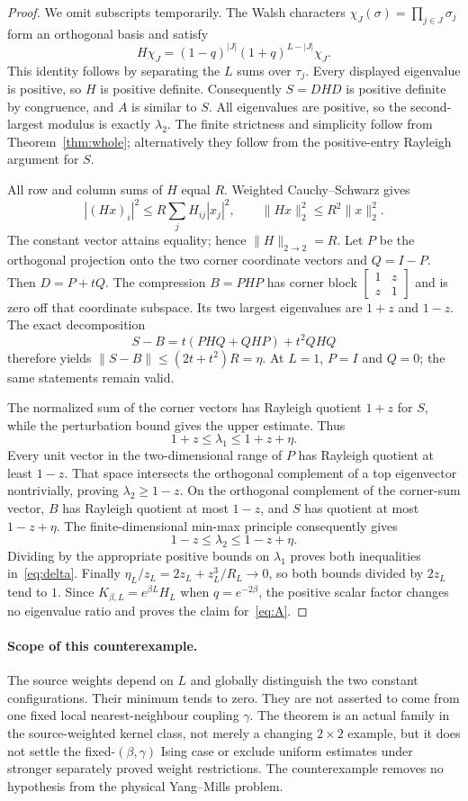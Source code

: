 \documentclass[11pt]{article}
\begin{document}
\begin{proof}
We omit subscripts temporarily. The Walsh characters
$\chi_J(\sigma)=\prod_{j\in J}\sigma_j$ form an orthogonal basis and satisfy
\[
 H\chi_J=(1-q)^{|J|}(1+q)^{L-|J|}\chi_J.
\]
This identity follows by separating the $L$ sums over $\tau_j$.
Every displayed eigenvalue is positive, so $H$ is positive definite.
Consequently $S=DHD$ is positive definite by congruence, and $A$ is similar to
$S$. All eigenvalues are positive, so the second-largest modulus is exactly
$\lambda_2$. The finite strictness and simplicity follow from
Theorem~\ref{thm:whole}; alternatively they follow from the positive-entry
Rayleigh argument for $S$.

All row and column sums of $H$ equal $R$. Weighted Cauchy--Schwarz gives
\[
 |(Hx)_i|^2\le R\sum_jH_{ij}|x_j|^2,
 \qquad \|Hx\|_2^2\le R^2\|x\|_2^2.
\]
The constant vector attains equality; hence $\|H\|_{2\to2}=R$.
Let $P$ be the orthogonal projection onto the two corner coordinate vectors
and $Q=I-P$. Then $D=P+tQ$. The compression $B=PHP$ has corner block
$\left[\begin{smallmatrix}1&z\\z&1\end{smallmatrix}\right]$ and is zero off
that coordinate subspace. Its two largest eigenvalues are $1+z$ and $1-z$.
The exact decomposition
\[
 S-B=t(PHQ+QHP)+t^2QHQ
\]
therefore yields $\|S-B\|\le(2t+t^2)R=\eta$.
At $L=1$, $P=I$ and $Q=0$; the same statements remain valid.

The normalized sum of the corner vectors has Rayleigh quotient $1+z$ for
$S$, while the perturbation bound gives the upper estimate. Thus
\[
 1+z\le\lambda_1\le1+z+\eta.
\]
Every unit vector in the two-dimensional range of $P$ has Rayleigh quotient
at least $1-z$. That space intersects the orthogonal complement of a top
eigenvector nontrivially, proving $\lambda_2\ge1-z$.
On the orthogonal complement of the corner-sum vector, $B$ has Rayleigh
quotient at most $1-z$, and $S$ has quotient at most $1-z+\eta$.
The finite-dimensional min-max principle consequently gives
\[
 1-z\le\lambda_2\le1-z+\eta.
\]
Dividing by the appropriate positive bounds on $\lambda_1$ proves both
inequalities in~\eqref{eq:delta}. Finally
$\eta_L/z_L=2z_L+z_L^3/R_L\to0$, so both bounds divided by $2z_L$ tend to $1$.
Since $K_{\beta,L}=e^{\beta L}H_L$ when $q=e^{-2\beta}$, the positive scalar
factor changes no eigenvalue ratio and proves the claim for~\eqref{eq:A}.
\end{proof}

\paragraph{Scope of this counterexample.}
The source weights depend on $L$ and globally distinguish the two constant
configurations. Their minimum tends to zero. They are not asserted to come from
one fixed local nearest-neighbour coupling $\gamma$. The theorem is an actual
family in the source-weighted kernel class, not merely a changing $2\times2$
example, but it does not settle the fixed-$(\beta,\gamma)$ Ising case or exclude
uniform estimates under stronger separately proved weight restrictions.
The counterexample removes no hypothesis from the physical Yang--Mills problem.
\end{document}
